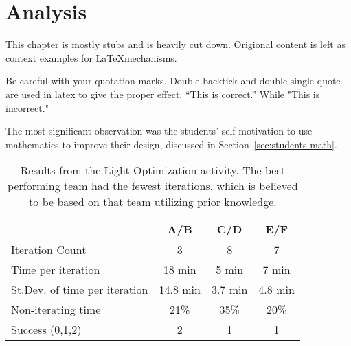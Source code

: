 \chapter{Analysis} \label{chap:analysis}

This chapter is mostly stubs and is heavily cut down. Origional content is left as context examples for \LaTeX mechanisms.

Be careful with your quotation marks. Double backtick and double single-quote are used in latex to give the proper effect. ``This is correct.'' While "This is incorrect."

The most significant observation was the students' self-motivation to use mathematics to improve their design, discussed in Section~\ref{sec:students-math}.

\begin{table}
\begin{centering}
\begin{tabular}{l c c c}
	\toprule
					& A/B 	& C/D 	& E/F 	\\ \midrule
	Iteration Count          & 3 		& 8 		& 7		\\ \midrule
	Time per iteration 	& 18 min	& 5 min	& 7 min	\\ \midrule
	St.Dev. of time per iteration 	& 14.8 min & 3.7 min & 4.8 min \\ \midrule
	Non-iterating time 	& 21\%      & 35\%	& 20\% 	\\ \midrule
	Success (0,1,2)	& 2		& 1		& 1		\\ 
	\bottomrule
\end{tabular}
\caption[Results from the Light Optimization activity.]{Results from the Light Optimization activity. The best performing team had the fewest iterations, which is believed to be based on that team utilizing prior knowledge.}
\label{tab:results-lights}
\end{centering}
\end{table}
